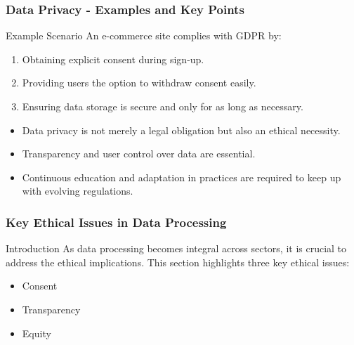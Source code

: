 \documentclass[aspectratio=169]{beamer}
\begin{document}
\begin{frame}[fragile]
    \frametitle{Data Privacy - Examples and Key Points}
    \begin{block}{Example Scenario}
        An e-commerce site complies with GDPR by:
        \begin{enumerate}
            \item Obtaining explicit consent during sign-up.
            \item Providing users the option to withdraw consent easily.
            \item Ensuring data storage is secure and only for as long as necessary.
        \end{enumerate}
    \end{block}
    
    \begin{itemize}
        \item Data privacy is not merely a legal obligation but also an ethical necessity.
        \item Transparency and user control over data are essential.
        \item Continuous education and adaptation in practices are required to keep up with evolving regulations.
    \end{itemize}
\end{frame}

\begin{frame}[fragile]
    \frametitle{Key Ethical Issues in Data Processing}
    \begin{block}{Introduction}
        As data processing becomes integral across sectors, it is crucial to address the ethical implications. This section highlights three key ethical issues: 
        \begin{itemize}
            \item Consent
            \item Transparency
            \item Equity
        \end{itemize}
    \end{block}
\end{frame}
\end{document}
